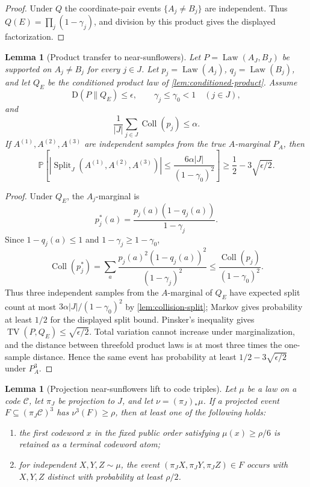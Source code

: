 \documentclass[11pt]{article}
\newcommand{\Cref}[1]{\ref{#1}}
\newtheorem{lemma}[theorem]{Lemma}
\theoremstyle{remark}
\newcommand{\C}{\mathcal C}
\newcommand{\Prob}{\mathbb P}
\newcommand{\KL}{\mathrm D}
\newcommand{\Split}{\operatorname{Split}}
\newcommand{\Law}{\operatorname{Law}}
\newcommand{\Coll}{\operatorname{Coll}}
\newcommand{\TV}{\operatorname{TV}}
\begin{document}
\begin{proof}
Under $Q$ the coordinate-pair events $\{A_j\ne B_j\}$ are independent.  Thus $Q(E)=\prod_j(1-\gamma_j)$, and division by this product gives the displayed factorization.
\end{proof}

\begin{lemma}[Product transfer to near-sunflowers]\label{lem:product-near-sunflower}
Let $P=\Law(A_J,B_J)$ be supported on $A_j\ne B_j$ for every $j\in J$.  Let $p_j=\Law(A_j)$, $q_j=\Law(B_j)$, and let $Q_E$ be the conditioned product law of \Cref{lem:conditioned-product}.  Assume
\[
        \KL(P\|Q_E)\le \epsilon,
        \qquad
        \gamma_j\le\gamma_0<1\quad(j\in J),
\]
and
\[
        \frac{1}{|J|}\sum_{j\in J}\Coll(p_j)\le\alpha.
\]
If $A^{(1)},A^{(2)},A^{(3)}$ are independent samples from the true $A$-marginal $P_A$, then
\[
        \Prob\left[|\Split_J(A^{(1)},A^{(2)},A^{(3)})|
        \le \frac{6\alpha |J|}{(1-\gamma_0)^2}\right]
        \ge \frac{1}{2}-3\sqrt{\epsilon/2}.
\]
\end{lemma}

\begin{proof}
Under $Q_E$, the $A_j$-marginal is
\[
        p_j^*(a)=\frac{p_j(a)(1-q_j(a))}{1-\gamma_j}.
\]
Since $1-q_j(a)\le1$ and $1-\gamma_j\ge1-\gamma_0$,
\[
        \Coll(p_j^*)=\sum_a \frac{p_j(a)^2(1-q_j(a))^2}{(1-\gamma_j)^2}
        \le \frac{\Coll(p_j)}{(1-\gamma_0)^2}.
\]
Thus three independent samples from the $A$-marginal of $Q_E$ have expected split count at most $3\alpha |J|/(1-\gamma_0)^2$ by \Cref{lem:collision-split}; Markov gives probability at least $1/2$ for the displayed split bound.  Pinsker's inequality gives $\TV(P,Q_E)\le\sqrt{\epsilon/2}$.  Total variation cannot increase under marginalization, and the distance between threefold product laws is at most three times the one-sample distance.  Hence the same event has probability at least $1/2-3\sqrt{\epsilon/2}$ under $P_A^3$.
\end{proof}

\begin{lemma}[Projection near-sunflowers lift to code triples]\label{lem:projection-lift}
Let $\mu$ be a law on a code $\C$, let $\pi_J$ be projection to $J$, and let $\nu=(\pi_J)_*\mu$.  If a projected event $F\subseteq(\pi_J\C)^3$ has $\nu^3(F)\ge\rho$, then at least one of the following holds:
\begin{enumerate}[label=\textup{(\roman*)}]
\item the first codeword $x$ in the fixed public order satisfying $\mu(x)\ge\rho/6$ is retained as a terminal codeword atom;
\item for independent $X,Y,Z\sim\mu$, the event $(\pi_JX,\pi_JY,\pi_JZ)\in F$ occurs with $X,Y,Z$ distinct with probability at least $\rho/2$.
\end{enumerate}
\end{lemma}
\end{document}
